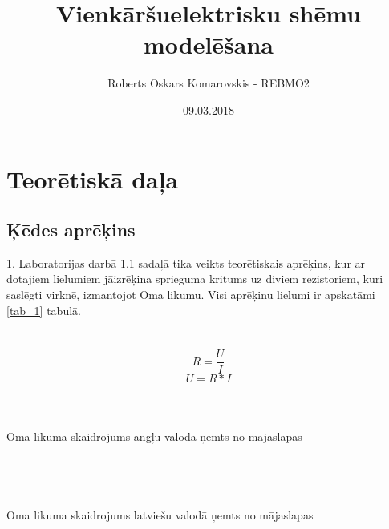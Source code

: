 \documentclass{report}
\title{Vienkāršuelektrisku shēmu modelēšana}
\author{Roberts Oskars Komarovskis - REBMO2}
\date{09.03.2018}
\begin{document}
\maketitle

\chapter{Teorētiskā daļa}
\section{Ķēdes aprēķins}

\par1. Laboratorijas darbā 1.1 sadaļā tika veikts teorētiskais aprēķins, kur ar dotajiem lielumiem jāizrēķina sprieguma kritums uz diviem rezistoriem, kuri saslēgti virknē, izmantojot Oma likumu.  Visi aprēķinu lielumi ir apskatāmi \ref{tab_1} tabulā.
\\
\\
\\
\begin{equation}
R=\frac{U}{I}
\end{equation}
\begin{equation}
U=R*I
\end{equation}
\\
\\
\\
Oma likuma skaidrojums angļu valodā ņemts no mājaslapas \cite{ohmlik}\\\\
\cite[The potential difference (voltage) across an ideal conductor is proportional to the current through it. The constant of proportionality is called the "resistance", R. Ohm's Law is given by: V = I R where V is the potential difference between two points which include a resistance R.]{ohmlik}
\\
\\
\\
Oma likuma skaidrojums latviešu valodā ņemts no mājaslapas \cite{ohmliklv}\\\\
\cite[Oma likums nosaka sakarību starp spriegumu un strāvu elektriskās ķēdes posmā. Strāvas stiprums ir tieši proporcionāls spriegumam. Cik reizes izmaina spriegumu, tikpat reižu izmainās strāvas stiprums. Strāvas stiprums I ir atkarīgs arī no patērētāja elektriskās pretestības. Jo lielāka ir pretestība, jo mazāka strāva plūst vadītājā. Strāvas stiprums ir apgriezti proporcionāls elektriskajai pretestībai. Likums nosaukts par godu vācu fiziķim Georgam Simonam Omam (Ohm).]{ohmliklv}
\end{document}

